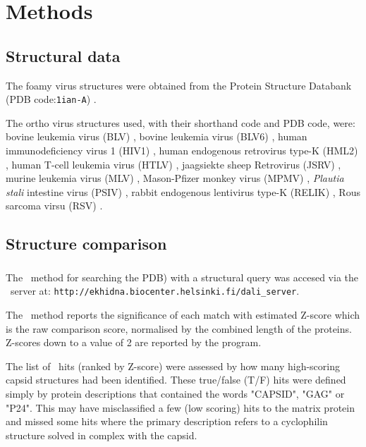 \section{Methods}

\subsection{Structural data}

The foamy virus structures were obtained from the Protein Structure Databank
(PDB code:{\tt 1ian-A}) \cite{ian}.

The ortho virus structures used, with their shorthand code and PDB code, were:
bovine leukemia virus (BLV) {\tt} \cite{},
bovine leukemia virus (BLV6) {\tt} \cite{},
human immunodeficiency virus 1 (HIV1) {\tt} \cite{},
human endogenous retrovirus type-K (HML2) {\tt} \cite{},
human T-cell leukemia virus (HTLV) {\tt} \cite{},
jaagsiekte sheep Retrovirus (JSRV) {\tt} \cite{},
murine leukemia virus (MLV) {\tt} \cite{},
Mason-Pfizer monkey virus (MPMV) {\tt} \cite{},
{\em Plautia stali} intestine virus (PSIV) {\tt} \cite{},
rabbit endogenous lentivirus type-K (RELIK) {\tt} \cite{},
Rous sarcoma virsu (RSV) {\tt} \cite{}.

\subsection{Structure comparison}

\subsubsection{\DALI}

The \DALI\ method for searching the PDB) with a structural query \cite{HolmLet93,HolmLet}
was accesed via the \DALI\ server at:
{\tt http://ekhidna.biocenter.helsinki.fi/dali\_server}.

The \DALI\ method reports the significance of each match with estimated Z-score
which is the raw comparison score, normalised by the combined length of the proteins.
Z-scores down to a value of 2 are reported by the program.

The list of \DALI\ hits (ranked by Z-score) were assessed by how many high-scoring capsid structures had
been identified.    These true/false (T/F) hits were defined simply by protein descriptions that contained the
words "CAPSID", "GAG" or "P24".   This may have misclassified a few (low scoring) hits to the matrix protein
and missed some hits where the primary description refers to a cyclophilin structure solved in complex 
with the capsid. 

